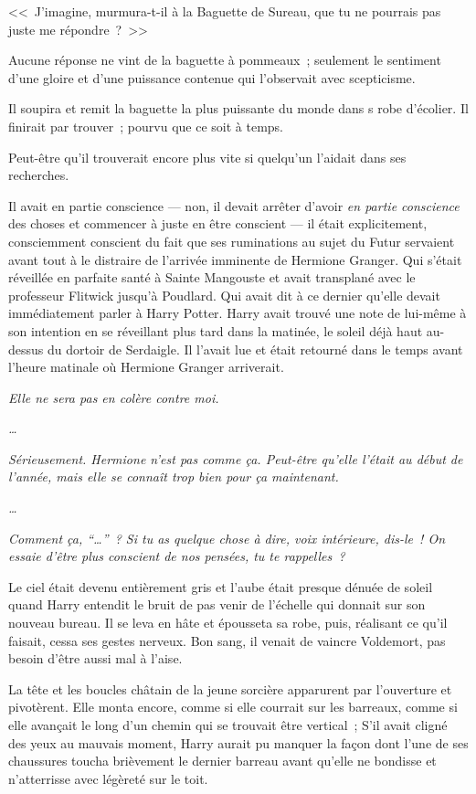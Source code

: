 <<~J'imagine, murmura-t-il à la Baguette de Sureau, que tu ne pourrais pas juste me répondre~?~>>

Aucune réponse ne vint de la baguette à pommeaux~; seulement le sentiment d'une gloire et d'une puissance contenue qui l'observait avec scepticisme.

Il soupira et remit la baguette la plus puissante du monde dans s robe d'écolier. Il finirait par trouver~; pourvu que ce soit à temps.

Peut-être qu'il trouverait encore plus vite si quelqu'un l'aidait dans ses recherches.

Il avait en partie conscience — non, il devait arrêter d'avoir \emph{en partie conscience} des choses et commencer à juste en être conscient — il était explicitement, consciemment conscient du fait que ses ruminations au sujet du Futur servaient avant tout à le distraire de l'arrivée imminente de Hermione Granger. Qui s'était réveillée en parfaite santé à Sainte Mangouste et avait transplané avec le professeur Flitwick jusqu'à Poudlard. Qui avait dit à ce dernier qu'elle devait immédiatement parler à Harry Potter. Harry avait trouvé une note de lui-même à son intention en se réveillant plus tard dans la matinée, le soleil déjà haut au-dessus du dortoir de Serdaigle. Il l'avait lue et était retourné dans le temps avant l'heure matinale où Hermione Granger arriverait.

\emph{Elle ne sera pas en colère contre moi.}

\emph{…}

\emph{Sérieusement. Hermione n'est pas comme ça. Peut-être qu'elle l'était au début de l'année, mais elle se connaît trop bien pour ça maintenant.}

\emph{…}

\emph{Comment ça, “…”~? Si tu as quelque chose à dire, voix intérieure, dis-le~! On essaie d'être plus conscient de nos pensées, tu te rappelles~?}

\later

Le ciel était devenu entièrement gris et l'aube était presque dénuée de soleil quand Harry entendit le bruit de pas venir de l'échelle qui donnait sur son nouveau bureau. Il se leva en hâte et épousseta sa robe, puis, réalisant ce qu'il faisait, cessa ses gestes nerveux. Bon sang, il venait de vaincre Voldemort, pas besoin d'être aussi mal à l'aise.

La tête et les boucles châtain de la jeune sorcière apparurent par l'ouverture et pivotèrent. Elle monta encore, comme si elle courrait sur les barreaux, comme si elle avançait le long d'un chemin qui se trouvait être vertical~; S'il avait cligné des yeux au mauvais moment, Harry aurait pu manquer la façon dont l'une de ses chaussures toucha brièvement le dernier barreau avant qu'elle ne bondisse et n'atterrisse avec légèreté sur le toit.

